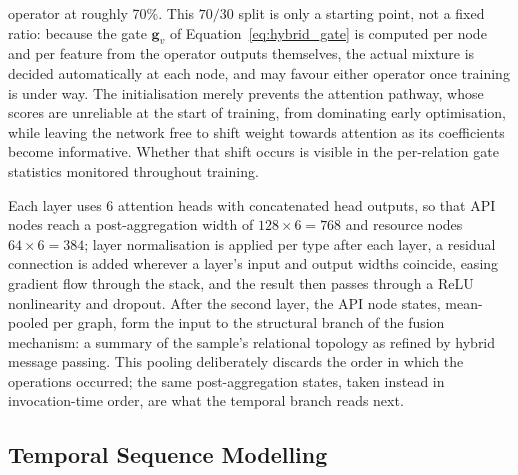 \documentclass[%
    BCOR=10mm,
    DIV=13,
    toc=bibliography,
    toc=listof,
    oneside,
    12pt,
]{scrbook}
\begin{document}
operator at roughly 70\%. This $70/30$ split is only a starting point, not a
fixed ratio: because the gate $\mathbf{g}_v$ of Equation~\ref{eq:hybrid_gate}
is computed per node and per feature from the operator outputs themselves, the
actual mixture is decided automatically at each node, and may favour either
operator once training is under way. The initialisation merely prevents the
attention pathway, whose scores are unreliable at the start of training, from
dominating early optimisation, while leaving the network free to shift weight
towards attention as its coefficients become informative. Whether that shift
occurs is visible in the per-relation gate statistics monitored throughout
training.

Each layer uses 6 attention heads with concatenated head outputs, so that API
nodes reach a post-aggregation width of $128 \times 6 = 768$ and resource
nodes $64 \times 6 = 384$; layer normalisation is applied per type after each
layer, a residual connection is added wherever a layer's input and output
widths coincide, easing gradient flow through the stack, and the result then
passes through a ReLU nonlinearity and dropout. After the second
layer, the API node states, mean-pooled per graph,
form the input to the structural branch of the fusion mechanism: a summary of
the sample's relational topology as refined by hybrid message passing. This
pooling deliberately discards the order in which the operations occurred; the
same post-aggregation states, taken instead in invocation-time order, are what
the temporal branch reads next.

\subsection{Temporal Sequence Modelling}
\label{subsec:temporal_branch}
\end{document}

